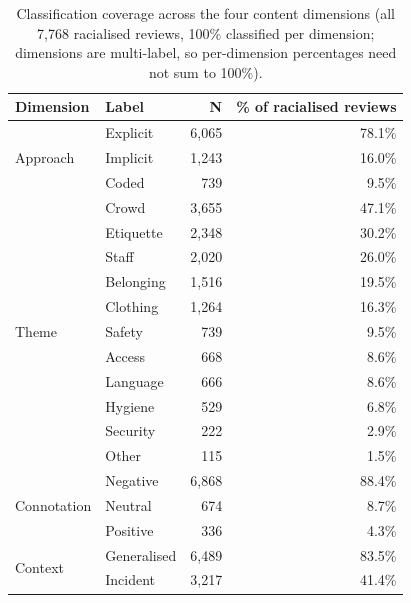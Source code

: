 \begin{table}
\caption{Classification coverage across the four content dimensions (all 7{,}768 racialised reviews, 100\% classified per dimension; dimensions are multi-label, so per-dimension percentages need not sum to 100\%).}
\label{tab:dimension-coverage}
\begin{tabular}{llrr}
\toprule
Dimension & Label & N & \% of racialised reviews \\
\midrule
\multirow[t]{3}{*}{Approach} & Explicit & 6,065 & 78.1\% \\
 & Implicit & 1,243 & 16.0\% \\
 & Coded & 739 & 9.5\% \\
\midrule
\multirow[t]{11}{*}{Theme} & Crowd & 3,655 & 47.1\% \\
 & Etiquette & 2,348 & 30.2\% \\
 & Staff & 2,020 & 26.0\% \\
 & Belonging & 1,516 & 19.5\% \\
 & Clothing & 1,264 & 16.3\% \\
 & Safety & 739 & 9.5\% \\
 & Access & 668 & 8.6\% \\
 & Language & 666 & 8.6\% \\
 & Hygiene & 529 & 6.8\% \\
 & Security & 222 & 2.9\% \\
 & Other & 115 & 1.5\% \\
\midrule
\multirow[t]{3}{*}{Connotation} & Negative & 6,868 & 88.4\% \\
 & Neutral & 674 & 8.7\% \\
 & Positive & 336 & 4.3\% \\
\midrule
\multirow[t]{2}{*}{Context} & Generalised & 6,489 & 83.5\% \\
 & Incident & 3,217 & 41.4\% \\
\bottomrule
\end{tabular}
\end{table}

